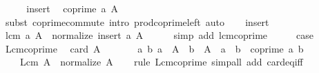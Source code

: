 \begin{isabellebody}
\ \ \isamarkupfalse%
\ \isamarkupfalse%
\ insert\ \isamarkupfalse%
\ {\isachardoublequoteopen}coprime\ a\ {\isacharparenleft}{\kern0pt}{\isasymProd}A{\isacharparenright}{\kern0pt}{\isachardoublequoteclose}\isanewline
\ \ \ \ \isamarkupfalse%
\ {\isacharparenleft}{\kern0pt}subst\ coprime{\isacharunderscore}{\kern0pt}commute{\isacharcomma}{\kern0pt}\ intro\ prod{\isacharunderscore}{\kern0pt}coprime{\isacharunderscore}{\kern0pt}left{\isacharparenright}{\kern0pt}\ auto\isanewline
\ \ \isamarkupfalse%
\ insert\ \isamarkupfalse%
\ {\isachardoublequoteopen}lcm\ a\ {\isacharparenleft}{\kern0pt}{\isasymProd}A{\isacharparenright}{\kern0pt}\ {\isacharequal}{\kern0pt}\ normalize\ {\isacharparenleft}{\kern0pt}{\isasymProd}{\isacharparenleft}{\kern0pt}insert\ a\ A{\isacharparenright}{\kern0pt}{\isacharparenright}{\kern0pt}{\isachardoublequoteclose}\isanewline
\ \ \ \ \isamarkupfalse%
\ {\isacharparenleft}{\kern0pt}simp\ add{\isacharcolon}{\kern0pt}\ lcm{\isacharunderscore}{\kern0pt}coprime{\isacharparenright}{\kern0pt}\isanewline
\ \ \isamarkupfalse%
\ \isamarkupfalse%
\ {\isacharquery}{\kern0pt}case\ \isacommand{{\isachardot}{\kern0pt}}\isamarkupfalse%
\isanewline
{}\isamarkupfalse%
%
\endisatagproof
{\isafoldproof}%
%
\isadelimproof
\isanewline
%
\endisadelimproof
\isanewline
{}\isamarkupfalse%
\ Lcm{\isacharunderscore}{\kern0pt}coprime{\isacharprime}{\kern0pt}{\isacharcolon}{\kern0pt}\isanewline
\ \ {\isachardoublequoteopen}card\ A\ {\isasymnoteq}\ {}\ {\isasymLongrightarrow}\isanewline
\ \ \ \ {\isacharparenleft}{\kern0pt}{\isasymAnd}a\ b{\isachardot}{\kern0pt}\ a\ {\isasymin}\ A\ {\isasymLongrightarrow}\ b\ {\isasymin}\ A\ {\isasymLongrightarrow}\ a\ {\isasymnoteq}\ b\ {\isasymLongrightarrow}\ coprime\ a\ b{\isacharparenright}{\kern0pt}\ {\isasymLongrightarrow}\isanewline
\ \ \ \ Lcm\ A\ {\isacharequal}{\kern0pt}\ normalize\ {\isacharparenleft}{\kern0pt}{\isasymProd}A{\isacharparenright}{\kern0pt}{\isachardoublequoteclose}\isanewline
%
\isadelimproof
\ \ %
\endisadelimproof
%
\isatagproof
{}\isamarkupfalse%
\ {\isacharparenleft}{\kern0pt}rule\ Lcm{\isacharunderscore}{\kern0pt}coprime{\isacharparenright}{\kern0pt}\ {\isacharparenleft}{\kern0pt}simp{\isacharunderscore}{\kern0pt}all\ add{\isacharcolon}{\kern0pt}\ card{\isacharunderscore}{\kern0pt}eq{\isacharunderscore}{\kern0pt}{}{\isacharunderscore}{\kern0pt}iff{\isacharparenright}{\kern0pt}%
\endisatagproof

\end{isabellebody}
